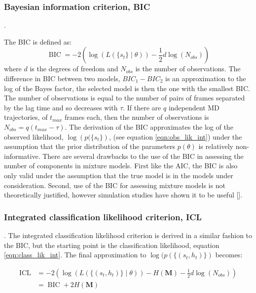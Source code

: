 \subsubsection{Bayesian information criterion, BIC}. 

The BIC is defined as: 
\begin{equation}\label{eqn:bic}
    \operatorname{BIC} = -2\left(\log{\left(L\left(\{s_t\}\middle|\theta\right)\right)} - \frac{1}{2}d\log{\left(N_{obs}\right)}\right)
\end{equation}
where $d$ is the degrees of freedom and $N_{obs}$ is the number of observations.  The difference in BIC between two models, $BIC_{1}-BIC_{2}$ is an approximation to the log of the Bayes factor, the selected model is then the one with the smallest BIC. The number of observations is equal to the number of pairs of frames separated by the lag time and so decreases with $\tau$. If there are $q$ independent MD trajectories, of $t_{max}$ frames each, then the number of observations is $N_{obs} = q(t_{max}-\tau)$. The derivation of the BIC approximates the log of the observed likelihood,  $\log{\left(p(\{s_t\}\right)}$, (see equation \ref{eqn:obs_lik_int}) under the assumption that the prior distribution of the parameters $p(\theta)$ is relatively non-informative. There are several drawbacks to the use of the BIC in assessing the number of components in mixture models. First like the AIC, the BIC is also only valid under the assumption that the true model is in the models under consideration. Second,  use of the BIC for assessing mixture models  is not theoretically justified, however simulation studies have shown it to be useful [].  

\subsubsection{Integrated classification likelihood criterion, ICL}. 
The integrated classification likelihood criterion is derived in a  similar fashion to the BIC, but the starting point is the classification likelihood, equation \ref{eqn:class_lik_int}. The final approximation to $\log{(p(\{(s_t, h_t)\})}$ becomes: 

\begin{equation}\label{eqn:icl}
\begin{split}
        \operatorname{ICL} &= -2\left(\log{\left(L\left(\{(s_t, h_{t})\}\middle|\theta\right)\right)} - H\left(\mathbf{M}\right) - \frac{1}{2}d\log{\left(N_{obs}\right)}\right)     \\
        & = \operatorname{BIC} + 2H\left(\mathbf{M}\right)
\end{split}
\end{equation}

